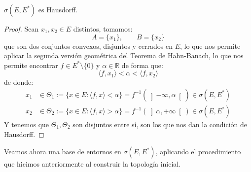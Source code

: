 \begin{prop}
    $\sigma(E,E^\ast)$ es Hausdorff.
    \begin{proof}
        Sean $x_1,x_2\in E$ distintos, tomamos:
        \begin{equation*}
            A = \{x_1\}, \qquad B = \{x_2\}
        \end{equation*}
        que son dos conjuntos convexos, disjuntos y cerrados en $E$, lo que nos permite aplicar la segunda versión geométrica del Teorema de Hahn-Banach, lo que nos permite encontrar $f\in E^\ast\setminus\{0\}$ y $\alpha\in \mathbb{R}$ de forma que:
        \begin{equation*}
            \langle f,x_1 \rangle  < \alpha < \langle f,x_2 \rangle 
        \end{equation*}
        de donde:
        \begin{align*}
            x_1 &\in \Theta_1 := \{x\in E : \langle f,x \rangle <\alpha\} = f^{-1}(\left]-\infty,\alpha\right[) \in \sigma(E,E^\ast) \\
            x_2 &\in \Theta_2 := \{x\in E : \langle f,x \rangle >\alpha\} = f^{-1}(\left]\alpha,+\infty\right[) \in \sigma(E,E^\ast) 
        \end{align*}
        Y tenemos que $\Theta_1,\Theta_2$ son disjuntos entre sí, son los que nos dan la condición de Hausdorff.
    \end{proof}
\end{prop}

\noindent
Veamos ahora una base de entornos en $\sigma(E,E^\ast)$, aplicando el procedimiento que hicimos anteriormente al construir la topología inicial.

